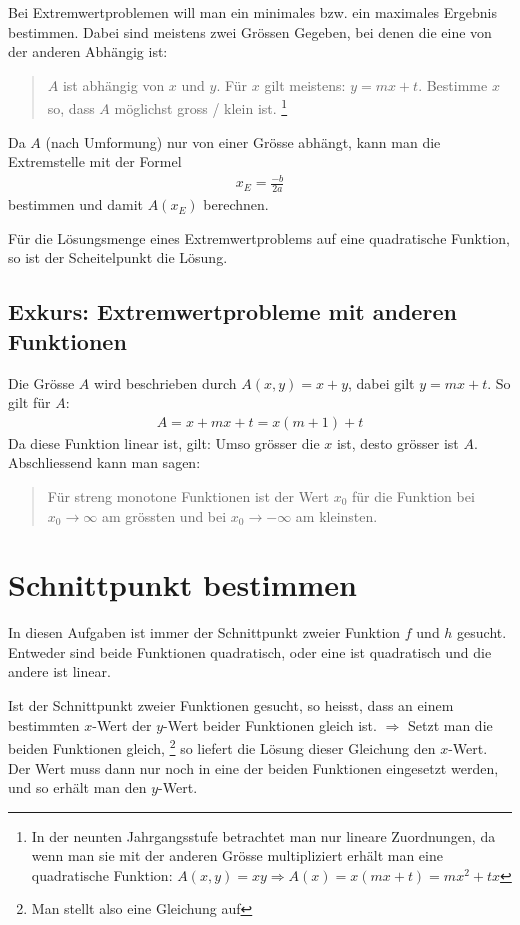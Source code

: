 \documentclass{report}
\newcommand{\Ra}{\Rightarrow}
\theoremstyle{definition}
\theoremstyle{definition}
\theoremstyle{an}
\theoremstyle{lem}
\theoremstyle{def}
\theoremstyle{def}
\begin{document}
	Bei Extremwertproblemen will man ein minimales bzw. ein maximales Ergebnis bestimmen. Dabei sind meistens zwei Grössen Gegeben, bei denen die eine von der anderen Abhängig ist:
	\begin{quotation}
		$A$ ist abhängig von $x$ und $y$. Für $x$ gilt meistens: $y =mx+t$. Bestimme $x$ so, dass $A$ möglichst gross / klein ist. \footnote{In der neunten Jahrgangsstufe betrachtet man nur lineare Zuordnungen, da wenn man sie mit der anderen Grösse multipliziert erhält man eine quadratische Funktion: $A(x,y)=xy \Ra A(x)=x(mx+t)=mx^2+tx$}
	\end{quotation}

	Da $A$ (nach Umformung) nur von einer Grösse abhängt, kann man die Extremstelle mit der Formel 
	\begin{align}
		x_E = \frac{-b}{2a}
	\end{align}
	bestimmen und damit $A(x_E)$ berechnen.
	
	\begin{defi}[Extremwertproblem]
		Für die Lösungsmenge eines Extremwertproblems auf eine quadratische Funktion, so ist der Scheitelpunkt die Lösung.
	\end{defi}

	\subsection*{Exkurs: Extremwertprobleme mit anderen Funktionen}
	Die Grösse $A$ wird beschrieben durch $A(x,y)=x+y$, dabei gilt $y = mx+t$. So gilt für $A$: 
	\begin{align}
		A=x+mx+t = x(m+1)+t
	\end{align} Da diese Funktion linear ist, gilt: Umso grösser die $x$ ist, desto grösser ist $A$. Abschliessend kann man sagen:

	\begin{quotation}
		Für streng monotone Funktionen ist der Wert $x_0$ für die Funktion bei $x_0 \to \infty$ am grössten und bei $x_0 \to - \infty$ am kleinsten.
	\end{quotation}

	\pagebreak
	\section{Schnittpunkt bestimmen}
	In diesen Aufgaben ist immer der Schnittpunkt zweier Funktion $f$ und $h$ gesucht. Entweder sind beide Funktionen quadratisch, oder eine ist quadratisch und die andere ist linear.
	
	\begin{defi}[Schnittwertprobleme]
		Ist der Schnittpunkt zweier Funktionen gesucht, so heisst, dass an einem bestimmten $x$-Wert der $y$-Wert beider Funktionen gleich ist. $\Rightarrow$ Setzt man die beiden Funktionen gleich,  \footnote{Man stellt also eine Gleichung auf} so liefert die Lösung dieser Gleichung den $x$-Wert. Der Wert muss dann nur noch in eine der beiden Funktionen eingesetzt werden, und so erhält man den $y$-Wert.
	\end{defi}
\end{document}
